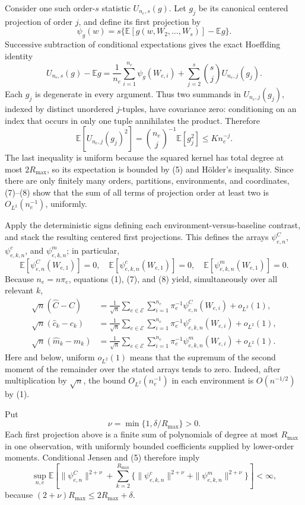 Consider one such order-\(s\) statistic \(U_{n_e,s}(g)\).  Let \(g_j\) be its canonical centered projection of order \(j\), and define its first projection by
\[
 \psi_g(w)=s\{\mathbb E[g(w,W_2,\ldots,W_s)]-\mathbb E g\}.
\]
Successive subtraction of conditional expectations gives the exact Hoeffding identity
\[
 U_{n_e,s}(g)-\mathbb E g
 =\frac1{n_e}\sum_{i=1}^{n_e}\psi_g(W_{e,i})
  +\sum_{j=2}^s {s\choose j}U_{n_e,j}(g_j). \tag{7}
\]
Each \(g_j\) is degenerate in every argument.  Thus two summands in \(U_{n_e,j}(g_j)\), indexed by distinct unordered \(j\)-tuples, have covariance zero: conditioning on an index that occurs in only one tuple annihilates the product.  Therefore
\[
 \mathbb E\!\left[U_{n_e,j}(g_j)^2\right]
 ={n_e\choose j}^{-1}\mathbb E[g_j^2]
 \leq K n_e^{-j}. \tag{8}
\]
The last inequality is uniform because the squared kernel has total degree at most \(2R_{\max}\), so its expectation is bounded by (5) and H\"older's inequality.  Since there are only finitely many orders, partitions, environments, and coordinates, (7)--(8) show that the sum of all terms of projection order at least two is \(O_{L^2}(n_e^{-1})\), uniformly.

Apply the deterministic signs defining each environment-versus-baseline contrast, and stack the resulting centered first projections.  This defines the arrays \(\psi^C_{e,n}\), \(\psi^c_{e,k,n}\), and \(\psi^m_{e,k,n}\); in particular,
\[
 \mathbb E[\psi^C_{e,n}(W_{e,1})]=0,
 \quad
 \mathbb E[\psi^c_{e,k,n}(W_{e,1})]=0,
 \quad
 \mathbb E[\psi^m_{e,k,n}(W_{e,1})]=0. \tag{9}
\]
Because \(n_e=n\pi_e\), equations (1), (7), and (8) yield, simultaneously over all relevant \(k\),
\[
 \begin{aligned}
 \sqrt n(\widehat C-C)
 &=\frac1{\sqrt n}\sum_{e\in\mathcal E}\sum_{i=1}^{n_e}
     \pi_e^{-1}\psi^C_{e,n}(W_{e,i})+o_{L^2}(1),\\
 \sqrt n(\widehat c_k-c_k)
 &=\frac1{\sqrt n}\sum_{e\in\mathcal E}\sum_{i=1}^{n_e}
     \pi_e^{-1}\psi^c_{e,k,n}(W_{e,i})+o_{L^2}(1),\\
 \sqrt n(\widehat m_k-m_k)
 &=\frac1{\sqrt n}\sum_{e\in\mathcal E}\sum_{i=1}^{n_e}
     \pi_e^{-1}\psi^m_{e,k,n}(W_{e,i})+o_{L^2}(1).
 \end{aligned} \tag{10}
\]
Here and below, uniform \(o_{L^2}(1)\) means that the supremum of the second moment of the remainder over the stated arrays tends to zero.  Indeed, after multiplication by \(\sqrt n\), the bound \(O_{L^2}(n_e^{-1})\) in each environment is \(O(n^{-1/2})\) by (1).

Put
\[
 \nu=\min\{1,\delta/R_{\max}\}>0.
\]
Each first projection above is a finite sum of polynomials of degree at most \(R_{\max}\) in one observation, with uniformly bounded coefficients supplied by lower-order moments.  Conditional Jensen and (5) therefore imply
\[
 \sup_{n,e}\mathbb E\!\left[
 \|\psi^C_{e,n}\|^{2+\nu}
 +\sum_{k=2}^{R_{\max}}
 \{\|\psi^c_{e,k,n}\|^{2+\nu}
   +\|\psi^m_{e,k,n}\|^{2+\nu}\}
 \right]<\infty, \tag{11}
\]
because \((2+\nu)R_{\max}\leq2R_{\max}+\delta\).

